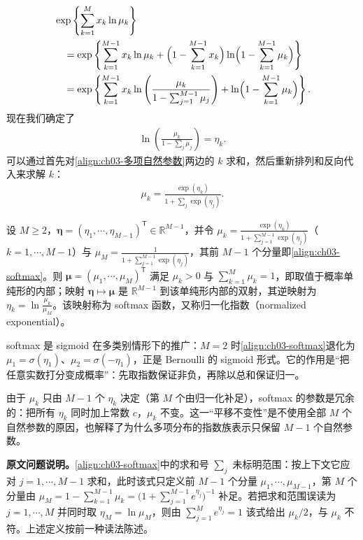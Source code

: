 \documentclass[../../main.tex]{subfiles}
\begin{document}
\begin{align}
&\exp\left\{\sum_{k=1}^{M}x_k\ln\mu_k\right\}\nonumber\\
&\quad=\exp\left\{\sum_{k=1}^{M-1}x_k\ln\mu_k+\Bigl(1-\sum_{k=1}^{M-1}x_k\Bigr)\ln\Bigl(1-\sum_{k=1}^{M-1}\mu_k\Bigr)\right\}\nonumber\\
&\quad=\exp\left\{\sum_{k=1}^{M-1}x_k\ln\left(\frac{\mu_k}{1-\sum_{j=1}^{M-1}\mu_j}\right)+\ln\Bigl(1-\sum_{k=1}^{M-1}\mu_k\Bigr)\right\}.
\label{align:ch03-多项重写}
\end{align}
现在我们确定了
\begin{align}
\ln\left(\frac{\mu_k}{1-\sum_{j}\mu_j}\right)=\eta_k.
\label{align:ch03-多项自然参数}
\end{align}
可以通过首先对\eqref{align:ch03-多项自然参数}两边的 $k$ 求和，然后重新排列和反向代入来求解 $k$：
\begin{align}
\mu_k=\frac{\exp(\eta_k)}{1+\sum_{j}\exp(\eta_j)}.
\label{align:ch03-softmax}
\end{align}

\begin{definition}[softmax 函数]\label{definition:ch03-softmax}
设 $M\geqslant2$，$\boldsymbol{\eta}=(\eta_1,\cdots,\eta_{M-1})^{\mathsf{T}}\in\mathbb{R}^{M-1}$，并令 $\mu_k=\frac{\exp(\eta_k)}{1+\sum_{j=1}^{M-1}\exp(\eta_j)}$（$k=1,\cdots,M-1$）与 $\mu_M=\frac{1}{1+\sum_{j=1}^{M-1}\exp(\eta_j)}$，其前 $M-1$ 个分量即\eqref{align:ch03-softmax}。则 $\boldsymbol{\mu}=(\mu_1,\cdots,\mu_M)^{\mathsf{T}}$ 满足 $\mu_k>0$ 与 $\sum_{k=1}^{M}\mu_k=1$，即取值于概率单纯形的内部；映射 $\boldsymbol{\eta}\mapsto\boldsymbol{\mu}$ 是 $\mathbb{R}^{M-1}$ 到该单纯形内部的双射，其逆映射为 $\eta_k=\ln\frac{\mu_k}{\mu_M}$。该映射称为 softmax 函数，又称归一化指数（normalized exponential）。
\end{definition}

\begin{remark}
softmax 是 sigmoid 在多类别情形下的推广：$M=2$ 时\eqref{align:ch03-softmax}退化为 $\mu_1=\sigma(\eta_1)$、$\mu_2=\sigma(-\eta_1)$，正是 Bernoulli 的 sigmoid 形式。它的作用是“把任意实数打分变成概率”：先取指数保证非负，再除以总和保证归一。

由于 $\mu_k$ 只由 $M-1$ 个 $\eta_k$ 决定（第 $M$ 个由归一化补足），softmax 的参数是冗余的：把所有 $\eta_k$ 同时加上常数 $c$，$\mu_k$ 不变。这一“平移不变性”是不使用全部 $M$ 个自然参数的原因，也解释了为什么多项分布的指数族表示只保留 $M-1$ 个自然参数。

\textbf{原文问题说明。}\eqref{align:ch03-softmax}中的求和号 $\sum_j$ 未标明范围：按上下文它应对 $j=1,\cdots,M-1$ 求和，此时该式只定义前 $M-1$ 个分量 $\mu_1,\cdots,\mu_{M-1}$，第 $M$ 个分量由 $\mu_M=1-\sum_{k=1}^{M-1}\mu_k=\bigl(1+\sum_{j=1}^{M-1}e^{\eta_j}\bigr)^{-1}$ 补足。若把求和范围误读为 $j=1,\cdots,M$ 并同时取 $\eta_M=\ln\mu_M$，则由 $\sum_{j=1}^{M}e^{\eta_j}=1$ 该式给出 $\mu_k/2$，与 $\mu_k$ 不符。上述定义按前一种读法陈述。
\end{remark}
\end{document}
